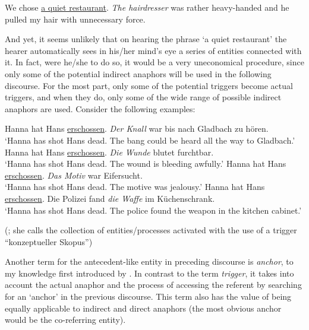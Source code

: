 \documentclass[output=paper]{langsci/langscibook}
\begin{document}
\begin{exe}
\ex\label{6ex:10}
We chose {\ul{a quiet restaurant}}. {\emph{The hairdresser}} was rather heavy-handed and he pulled my hair with unnecessary force.
\end{exe}

And yet, it seems unlikely that on hearing the phrase `a quiet restaurant' the hearer automatically sees in his/her mind's eye a series of entities connected with it. In fact, were he/she to do so, it would be a very uneconomical procedure, since only some of the potential indirect anaphors will be used in the following discourse. For the most part, only some of the potential triggers become actual triggers, and when they do, only some of the wide range of possible indirect anaphors are used. Consider the following examples:

\begin{exe}
\ex\label{6ex:11}
	\begin{xlista}
	\ex\label{6ex:11a}
	Hanna hat Hans {\ul{erschossen}}. {\emph{Der Knall}} war bis nach Gladbach zu hören. \\
	`Hanna has shot Hans dead. The bang could be heard all the way to Gladbach.'
	\ex\label{6ex:11b}
	Hanna hat Hans {\ul{erschossen}}. {\emph{Die Wunde}} blutet furchtbar. \\
	`Hanna has shot Hans dead. The wound is bleeding awfully.'
	\ex\label{6ex:11c}
	Hanna hat Hans {\ul{erschossen}}. {\emph{Das Motiv}} war Eifersucht. \\
	`Hanna has shot Hans dead. The motive was jealousy.'
	\ex\label{6ex:11c}
	Hanna hat Hans {\ul{erschossen}}. Die Polizei fand {\emph{die Waffe}} im Küchenschrank. \\
	`Hanna has shot Hans dead. The police found the weapon in the kitchen cabinet.'
	\end{xlista}
 (\citealt[][38]{schwarz:00}; she calls the collection of entities/processes activated with the use of a trigger ``konzeptueller Skopus'')
\end{exe}

Another term for the antecedent-like entity in preceding discourse is {\emph{anchor}}, to my knowledge first introduced by \cite{fraurud:90}. In contrast to the term {\emph{trigger}}, it takes into account the actual anaphor and the process of accessing the referent by searching for an `anchor' in the previous discourse. This term also has the value of being equally applicable to indirect and direct anaphors (the most obvious anchor would be the co-referring entity).
\end{document}

